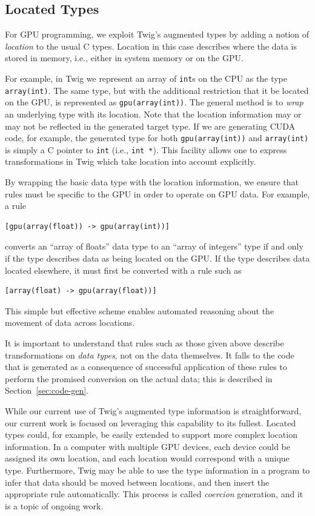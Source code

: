 \subsection{Located Types}
\label{sec:located-types}

For GPU programming, we exploit Twig's augmented types by adding a notion of \emph{location} to the usual C types. Location in this case describes where the data is stored in memory, i.e., either in system memory or on the GPU.

For example, in Twig we represent an array of \texttt{int}s on the CPU as the type \texttt{array(int)}. The same type, but with the additional restriction that it be located on the GPU, is represented as \texttt{gpu(array(int))}. The general method is to \emph{wrap} an underlying type with its location. Note that the location information may or may not be reflected in the generated target type. If we are generating CUDA code, for example, the generated type for both \texttt{gpu(array(int))} and \texttt{array(int)} is simply a C pointer to \texttt{int} (i.e., \texttt{int *}). This facility allows one to express transformations in Twig which take location into account explicitly.

By wrapping the basic data type with the location information, we ensure that rules must be specific to the GPU in order to operate on GPU data. For example, a rule

\begin{verbatim}
[gpu(array(float)) -> gpu(array(int))]
\end{verbatim}

converts an ``array of floats'' data type to an ``array of integers'' type if and only if the type describes data as being located on the GPU. If the type describes data located elsewhere, it must first be converted with a rule such as

\begin{verbatim}
[array(float) -> gpu(array(float))]
\end{verbatim}

This simple but effective scheme enables automated reasoning about the movement of data across locations.

It is important to understand that rules such as those given above describe transformations on \emph{data types}, not on the data themselves. It falls to the code that is generated as a consequence of successful application of these rules to perform the promised conversion on the actual data; this is described in Section~\ref{sec:code-gen}.

While our current use of Twig's augmented type information is straightforward, our current work is focused on leveraging this capability to its fullest. Located types could, for example, be easily extended to support more complex location information. In a computer with multiple GPU devices, each device could be assigned its own location, and each location would correspond with a unique type. Furthermore, Twig may be able to use the type information in a program to infer that data should be moved between locations, and then insert the appropriate rule automatically. This process is called \emph{coercion} generation, and it is a topic of ongoing work.
